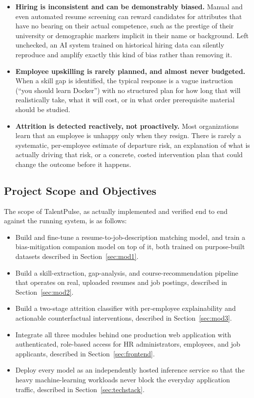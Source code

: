 \documentclass[11pt,a4paper]{article}
\begin{document}
\begin{itemize}[leftmargin=1.4cm]
  \item \textbf{Hiring is inconsistent and can be demonstrably biased.} Manual and even automated resume screening can reward candidates for attributes that have no bearing on their actual competence, such as the prestige of their university or demographic markers implicit in their name or background. Left unchecked, an AI system trained on historical hiring data can silently reproduce and amplify exactly this kind of bias rather than removing it.
  \item \textbf{Employee upskilling is rarely planned, and almost never budgeted.} When a skill gap is identified, the typical response is a vague instruction (``you should learn Docker'') with no structured plan for how long that will realistically take, what it will cost, or in what order prerequisite material should be studied.
  \item \textbf{Attrition is detected reactively, not proactively.} Most organizations learn that an employee is unhappy only when they resign. There is rarely a systematic, per-employee estimate of departure risk, an explanation of what is actually driving that risk, or a concrete, costed intervention plan that could change the outcome before it happens.
\end{itemize}

\subsection{Project Scope and Objectives}

The scope of TalentPulse, as actually implemented and verified end to end against the running system, is as follows:

\begin{itemize}[leftmargin=1.4cm]
  \item Build and fine-tune a resume-to-job-description matching model, and train a bias-mitigation companion model on top of it, both trained on purpose-built datasets described in Section~\ref{sec:mod1}.
  \item Build a skill-extraction, gap-analysis, and course-recommendation pipeline that operates on real, uploaded resumes and job postings, described in Section~\ref{sec:mod2}.
  \item Build a two-stage attrition classifier with per-employee explainability and actionable counterfactual interventions, described in Section~\ref{sec:mod3}.
  \item Integrate all three modules behind one production web application with authenticated, role-based access for HR administrators, employees, and job applicants, described in Section~\ref{sec:frontend}.
  \item Deploy every model as an independently hosted inference service so that the heavy machine-learning workloads never block the everyday application traffic, described in Section~\ref{sec:techstack}.
\end{itemize}
\end{document}
